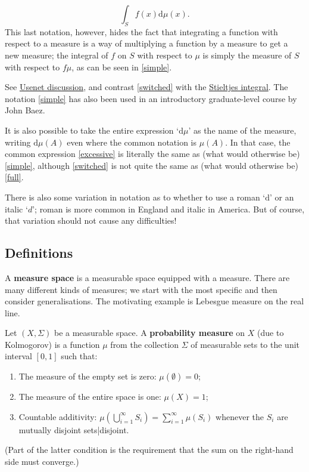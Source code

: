 \documentclass[preprint, 5p, 10pt]{elsarticle}
\theoremstyle{plain}
\begin{document}
\begin{equation}
\int_S f(x) \mathrm{d}\mu(x) .
\label{switched}\end{equation}
This last notation, however, hides the fact that integrating a function with respect to a measure is a way of multiplying a function by a measure to get a new measure; the integral of $f$ on $S$ with respect to $\mu$ is simply the measure of $S$ with respect to $f \mu$, as can be seen in \eqref{simple}.

See \href{http://groups.google.com/group/sci.math.research/browse_thread/thread/e28593bfd6b83aac/67a61d19e8f4d57f}{Usenet discussion}, and contrast \eqref{switched} with the \href{http://secure.wikimedia.org/wikipedia/en/wiki/Stieltjes_integral}{Stieltjes integral}. The notation \eqref{simple} has also been used in an introductory graduate-level course by John Baez.

It is also possible to take the entire expression ‘$\mathrm{d}\mu$’ as the name of the measure, writing $\mathrm{d}\mu(A)$ even where the common notation is $\mu(A)$. In that case, the common expression \eqref{excessive} is literally the same as (what would otherwise be) \eqref{simple}, although \eqref{switched} is not quite the same as (what would otherwise be) \eqref{full}.

There is also some variation in notation as to whether to use a roman ‘$\mathrm{d}$’ or an italic ‘$\mathit{d}$’; roman is more common in England and italic in America. But of course, that variation should not cause any difficulties!

\hypertarget{definitions_6}{}\subsection*{{Definitions}}\label{definitions_6}

A \textbf{measure space} is a measurable space equipped with a measure. There are many different kinds of measures; we start with the most specific and then consider generalisations. The motivating example is Lebesgue measure on the real line.

Let $(X, \Sigma)$ be a measurable space. A \textbf{probability measure} on $X$ (due to Kolmogorov) is a function $\mu$ from the collection $\Sigma$ of measurable sets to the unit interval $[0,1]$ such that:

\begin{enumerate}%
\item The measure of the empty set is zero: $\mu(\emptyset) = 0$;
\item The measure of the entire space is one: $\mu(X) = 1$;
\item Countable additivity: $\mu(\bigcup_{i = 1}^{\infty} S_i) = \sum_{i=1}^{\infty} \mu(S_i)$ whenever the $S_i$ are mutually disjoint sets|disjoint.

\end{enumerate}
(Part of the latter condition is the requirement that the sum on the right-hand side must converge.)
\end{document}
